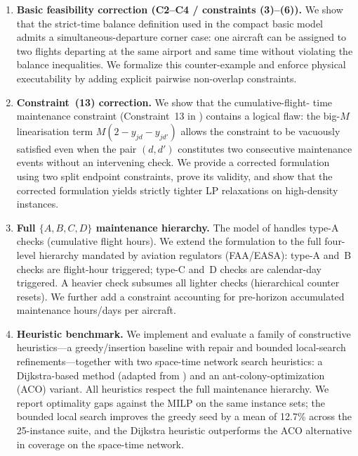 \begin{enumerate}
\item \textbf{Basic feasibility correction (C2--C4 / constraints (3)--(6)).}
  We show that the strict-time balance definition used in the compact basic
  model admits a simultaneous-departure corner case: one aircraft can be
  assigned to two flights departing at the same airport and same time without
  violating the balance inequalities.  We formalize this counter-example and
  enforce physical executability by adding explicit pairwise non-overlap
  constraints.

\item \textbf{Constraint~(13) correction.}  We show that the cumulative-flight-
  time maintenance constraint (Constraint~13 in \citet{khaled2018compact})
  contains a logical flaw: the big-$M$ linearisation term $M(2 - y_{jd} -
  y_{jd'})$ allows the constraint to be vacuously satisfied even when the pair
  $(d, d')$ constitutes two consecutive maintenance events without an
  intervening check.  We provide a corrected formulation using two split
  endpoint constraints, prove its validity, and show that the corrected
  formulation yields strictly tighter LP relaxations on high-density instances.

\item \textbf{Full $\{A, B, C, D\}$ maintenance hierarchy.}  The model of
  \citet{khaled2018compact} handles type-A checks (cumulative flight hours).
  We extend the formulation to the full four-level hierarchy mandated by
  aviation regulators (FAA/EASA): type-A and~B checks are flight-hour
  triggered; type-C and~D checks are calendar-day triggered.  A heavier check
  subsumes all lighter checks (hierarchical counter resets).  We further add
  a constraint accounting for pre-horizon accumulated maintenance hours/days
  per aircraft.

\item \textbf{Heuristic benchmark.}  We implement and evaluate a family of
  constructive heuristics---a greedy/insertion baseline with repair and
  bounded local-search refinements---together with two space-time network
  search heuristics: a Dijkstra-based method (adapted from
  \citet{gronkvist2005tail}) and an ant-colony-optimization (ACO) variant.
  All heuristics respect the full maintenance hierarchy.  We report optimality
  gaps against the MILP on the same instance sets; the bounded local search
  improves the greedy seed by a mean of 12.7\% across the 25-instance suite,
  and the Dijkstra heuristic outperforms the ACO alternative in coverage on
  the space-time network.
\end{enumerate}

